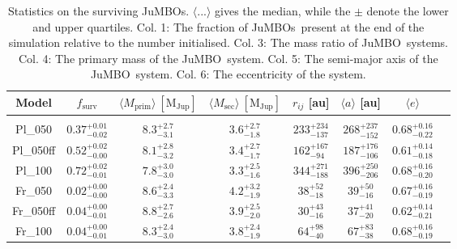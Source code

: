 \documentclass[submission,phys]{lib/SciPost}
\newcommand{\jumbo}{\mbox{JuMBO}}
\newcommand{\jumbos}{\mbox{JuMBOs}}
\begin{document}
\begin{table}
         \caption{Statistics on the surviving \jumbos. $\langle
           ...\rangle$ gives the median, while the $\pm$ denote 
           the lower and upper quartiles. Col. 1: The fraction of
           \jumbos\, present at the end of the simulation relative to
           the number initialised. Col. 3: The mass ratio of \jumbo\,
           systems. Col. 4: The primary mass of the \jumbo\,
           system. Col. 5: The semi-major axis of the \jumbo\,
           system. Col. 6: The eccentricity of the system.  }
        \label{Tab:SF_Res}
        \centering 
        \begin{tabular}{c c c c c c c c}
        \hline\hline
        Model & $f_{\mathrm{surv}}$ & $\langle M_{\mathrm{prim}} \rangle\ [\mathrm{M_{\mathrm{Jup}}}]$ & $\langle M_{\mathrm{sec}} \rangle\ [\mathrm{M_{\mathrm{Jup}}}]$ & $r_{ij}$ [au] &$\langle a \rangle$ [au] & $\langle e \rangle$\\
        \hline \vspace{-0.75em}\\ 
           Pl\_050     & $0.37^{+0.01}_{-0.02}$ & $8.3^{+2.7}_{-3.1}$ & $3.6^{+2.7}_{-1.8}$ & $233^{+234}_{-137}$ & $268^{+237}_{-152}$ & $0.68^{+0.16}_{-0.22}$ \vspace{0.25em}\\
           Pl\_050ff   & $0.52^{+0.02}_{-0.00}$ & $8.1^{+2.8}_{-3.2}$ & $3.4^{+2.7}_{-1.7}$ & $162^{+167}_{-94}$ & $187^{+176}_{-106}$ & $0.61^{+0.14}_{-0.18}$ \vspace{0.25em}\\
           Pl\_100      & $0.72^{+0.02}_{-0.01}$ & $7.8^{+3.0}_{-3.0}$ & $3.3^{+2.5}_{-1.6}$ & $344^{+271}_{-188}$ & $396^{+250}_{-206}$ & $0.68^{+0.16}_{-0.20}$ \vspace{0.25em}\\
           Fr\_050     & $0.02^{+0.00}_{-0.00}$ & $8.6^{+2.4}_{-3.3}$ & $4.2^{+3.2}_{-1.9}$ & $38^{+52}_{-18}$ & $39^{+50}_{-16}$ & $0.67^{+0.16}_{-0.19}$ \vspace{0.25em}\\
           Fr\_050ff   & $0.04^{+0.00}_{-0.01}$ & $8.8^{+2.7}_{-2.6}$ & $3.9^{+2.5}_{-2.0}$ & $30^{+43}_{-16}$ & $37^{+41}_{-20}$ & $0.62^{+0.14}_{-0.21}$ \vspace{0.25em}\\
           Fr\_100      & $0.04^{+0.00}_{-0.01}$ & $8.3^{+2.4}_{-3.0}$ & $3.8^{+2.4}_{-1.9}$ & $64^{+98}_{-40}$ & $67^{+83}_{-38}$ & $0.68^{+0.16}_{-0.19}$ \vspace{0.25em}\\

\end{tabular}
\end{table}
\end{document}
